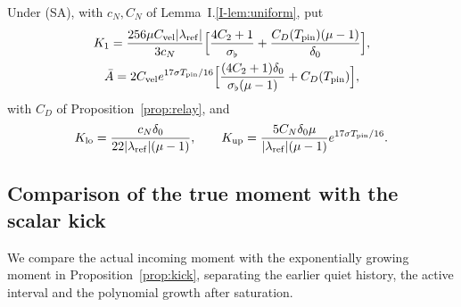 \begin{definition}
\label{def:K1}
Under (SA), with $c_N,C_N$ of Lemma~I.\ref{I-lem:uniform}, put
\begin{equation}
\label{eq:K1}
\begin{gathered}
K_1=\frac{256\mu C_{\mathrm{vel}} |\lambda_{\mathrm{ref}}|}{3c_N}\Big[\frac{4C_2+1}{\sigma_\flat}+\frac{C_D(T_{\mathrm{pin}})(\mu-1)}{\delta_0}\Big],\\
\bar A=2C_{\mathrm{vel}} e^{17\sigma T_{\mathrm{pin}}/16}\Big[\frac{(4C_2+1)\delta_0}{\sigma_\flat(\mu-1)}+C_D(T_{\mathrm{pin}})\Big],
\end{gathered}
\end{equation}
with $C_D$ of Proposition~\ref{prop:relay}, and
\[
K_{\mathrm{lo}}=\frac{c_N\delta_0}{22|\lambda_{\mathrm{ref}}|(\mu-1)},\qquad K_{\mathrm{up}}=\frac{5C_N\delta_0\mu}{|\lambda_{\mathrm{ref}}|(\mu-1)}e^{17\sigma T_{\mathrm{pin}}/16}.
\]
\end{definition}

\subsection{Comparison of the true moment with the scalar kick}
\label{sec:proof-kicktrue}

We compare the actual incoming moment with the exponentially growing moment
in Proposition~\ref{prop:kick}, separating the earlier quiet history, the
active interval and the polynomial growth after saturation.

